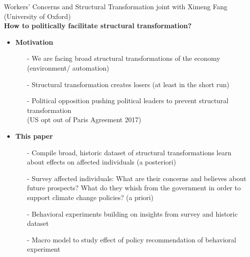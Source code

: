\begin{frame}{Workers' Concerns and Structural Transformation}
	\vspace{-5mm}
	\hspace{-6mm}\footnotesize{joint with Ximeng Fang (University of Oxford)}\\
	
	
	\vspace{2mm}\textbf{\alert{How to politically facilitate structural transformation?}}
	\vspace{-1.6mm}
	\pause
	\begin{itemize}[<+->]
		\item \textbf{Motivation}
		\begin{itemize}
			\item[-] We are facing broad structural transformations of the economy (environment/ automation)
			\item[-] Structural transformation creates losers (at least in the short run)
			\item[-] Political opposition pushing political leaders to prevent structural transformation \\(US opt out of Paris Agreement 2017)
		\end{itemize}
		\item \textbf{This paper}
		\begin{itemize}
			\item[-] Compile broad, historic dataset of structural transformations \ar learn about effects on affected individuals (a posteriori)
			\item[-] Survey affected individuals: What are their concerns and believes about future prospects? What do they whish from the government in order to support climate change policies? (a priori)
			\item[-] Behavioral experiments building on insights from survey and historic dataset
			\item[-] Macro model to study effect of policy recommendation of behavioral experiment
		\end{itemize}
	\end{itemize}
\end{frame}

